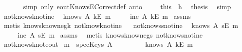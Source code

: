 \begin{isabellebody}
\ \ \ \ \ \isamarkupfalse%
\ {\isacharparenleft}simp\ only{\isacharcolon}\ eoutKnowsECorrect{\isacharunderscore}def{\isacharcomma}\ auto{\isacharparenright}\ \isanewline
\ \ \isamarkupfalse%
\ this\ \ h{}\ \isamarkupfalse%
\ {\isacharquery}thesis\ \isamarkupfalse%
\ simp\isanewline
{}\isamarkupfalse%
%
\endisatagproof
{\isafoldproof}%
%
\isadelimproof
\isanewline
%
\endisadelimproof
\isanewline
{}\isamarkupfalse%
\ not{\isacharunderscore}knows{\isacharunderscore}k{\isacharunderscore}not{\isacharunderscore}ine{\isacharcolon}\isanewline
{}\ {\isachardoublequoteopen}{\isasymnot}\ knows\ A\ {\isacharbrackleft}kE\ m{\isacharbrackright}{\isachardoublequoteclose}\isanewline
{}\ \ \ \ {\isachardoublequoteopen}{\isasymnot}\ ine\ A\ {\isacharparenleft}kE\ m{\isacharparenright}{\isachardoublequoteclose}\isanewline
%
\isadelimproof
%
\endisadelimproof
%
\isatagproof
{}\isamarkupfalse%
\ assms\ \isamarkupfalse%
\ {\isacharparenleft}metis\ knows{}know{\isacharunderscore}neg{\isacharunderscore}k\ not{\isacharunderscore}know{\isacharunderscore}k{\isacharunderscore}not{\isacharunderscore}ine{\isacharparenright}%
\endisatagproof
{\isafoldproof}%
%
\isadelimproof
\ \isanewline
%
\endisadelimproof
\isanewline
{}\isamarkupfalse%
\ not{\isacharunderscore}knows{\isacharunderscore}s{\isacharunderscore}not{\isacharunderscore}ine{\isacharcolon}\isanewline
{}\ {\isachardoublequoteopen}{\isasymnot}\ knows\ A\ {\isacharbrackleft}sE\ m{\isacharbrackright}{\isachardoublequoteclose}\isanewline
{}\ \ \ \ {\isachardoublequoteopen}{\isasymnot}\ ine\ A\ {\isacharparenleft}sE\ m{\isacharparenright}{\isachardoublequoteclose}\isanewline
%
\isadelimproof
%
\endisadelimproof
%
\isatagproof
{}\isamarkupfalse%
\ assms\ \isamarkupfalse%
\ {\isacharparenleft}metis\ knows{}know{\isacharunderscore}neg{\isacharunderscore}s\ not{\isacharunderscore}know{\isacharunderscore}s{\isacharunderscore}not{\isacharunderscore}ine{\isacharparenright}%
\endisatagproof
{\isafoldproof}%
%
\isadelimproof
\ \isanewline
%
\endisadelimproof
\isanewline
{}\isamarkupfalse%
\ not{\isacharunderscore}knows{\isacharunderscore}k{\isacharunderscore}not{\isacharunderscore}eout{\isacharcolon}\isanewline
{}\ {\isachardoublequoteopen}m\ {\isasymnotin}\ specKeys\ A{\isachardoublequoteclose}\isanewline
\ \ \ \ \ \ \ \ {\isachardoublequoteopen}{\isasymnot}\ knows\ A\ {\isacharbrackleft}kE\ m{\isacharbrackright}{\isachardoublequoteclose}\isanewline

\end{isabellebody}
